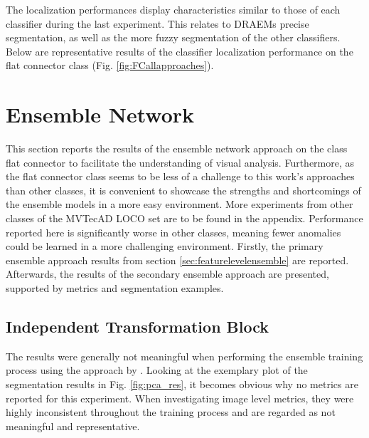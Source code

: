 The localization performances display characteristics similar to those of each classifier during the last experiment. This relates to DRAEMs \cite{Zavrtanik_2021DRAEM} precise segmentation, 
as well as the more fuzzy segmentation of the other classifiers. Below are representative results of the classifier localization performance on the flat connector class (Fig. \ref{fig:FCallapproaches}).






\section{Ensemble Network}
\label{sec:ensembleresults}

This section reports the results of the ensemble network approach on the class flat connector to facilitate the understanding of visual 
analysis. Furthermore, as the flat connector class seems to be less of a challenge to this work's approaches than other classes, it is convenient to showcase the strengths and 
shortcomings of the ensemble models in a more easy environment. More experiments from other classes of the MVTecAD LOCO \cite{LOCODentsAndScratchesBergmann2022} set are to be found in the appendix. 
Performance reported here is significantly worse in other classes, meaning fewer anomalies could be learned in a more challenging environment. Firstly, the primary ensemble approach results from section \ref{sec:featurelevelensemble} are reported. Afterwards, 
the results of the secondary ensemble approach are presented, supported by metrics and segmentation examples.


\subsection{Independent Transformation Block}
\label{subsec:ITBfail}

The results were generally not meaningful when performing the ensemble training process using the approach by \cite{EnsembleHeller2023}. Looking at the exemplary plot of the segmentation 
results in Fig. \ref{fig:pca_res}, it becomes obvious why no metrics are reported for this experiment. When investigating image level metrics, they were highly inconsistent throughout 
the training process and are regarded as not meaningful and representative.



